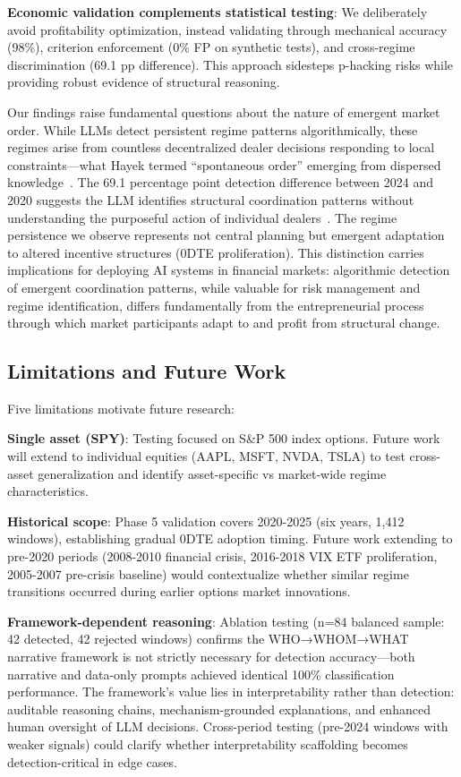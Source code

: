\textbf{Economic validation complements statistical testing}: We deliberately avoid profitability optimization, instead validating through mechanical accuracy (98\%), criterion enforcement (0\% FP on synthetic tests), and cross-regime discrimination (69.1 pp difference). This approach sidesteps p-hacking risks while providing robust evidence of structural reasoning.

Our findings raise fundamental questions about the nature of emergent market order. While LLMs detect persistent regime patterns algorithmically, these regimes arise from countless decentralized dealer decisions responding to local constraints—what Hayek termed ``spontaneous order'' emerging from dispersed knowledge~\citep{hayek1945}. The 69.1 percentage point detection difference between 2024 and 2020 suggests the LLM identifies structural coordination patterns without understanding the purposeful action of individual dealers~\citep{mises1949,rothbard1962}. The regime persistence we observe represents not central planning but emergent adaptation to altered incentive structures (0DTE proliferation). This distinction carries implications for deploying AI systems in financial markets: algorithmic detection of emergent coordination patterns, while valuable for risk management and regime identification, differs fundamentally from the entrepreneurial process through which market participants adapt to and profit from structural change.

\subsection{Limitations and Future Work}

Five limitations motivate future research:

\textbf{Single asset (SPY)}: Testing focused on S\&P 500 index options. Future work will extend to individual equities (AAPL, MSFT, NVDA, TSLA) to test cross-asset generalization and identify asset-specific vs market-wide regime characteristics.

\textbf{Historical scope}: Phase 5 validation covers 2020-2025 (six years, 1,412 windows), establishing gradual 0DTE adoption timing. Future work extending to pre-2020 periods (2008-2010 financial crisis, 2016-2018 VIX ETF proliferation, 2005-2007 pre-crisis baseline) would contextualize whether similar regime transitions occurred during earlier options market innovations.

\textbf{Framework-dependent reasoning}: Ablation testing (n=84 balanced sample: 42 detected, 42 rejected windows) confirms the WHO→WHOM→WHAT narrative framework is not strictly necessary for detection accuracy—both narrative and data-only prompts achieved identical 100\% classification performance. The framework's value lies in interpretability rather than detection: auditable reasoning chains, mechanism-grounded explanations, and enhanced human oversight of LLM decisions. Cross-period testing (pre-2024 windows with weaker signals) could clarify whether interpretability scaffolding becomes detection-critical in edge cases.

